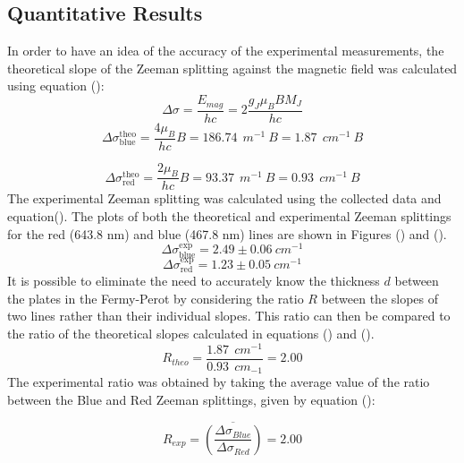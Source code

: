 \documentclass[12pt]{article}
\begin{document}
\subsection{Quantitative Results}
In order to have an idea of the accuracy of the experimental measurements, the theoretical slope of the Zeeman splitting against the magnetic field was calculated using equation ():
$$
\Delta \sigma=  \frac{E_{mag}}{hc}=2\frac{g_J \mu_B B M_J}{hc}
$$
\begin{equation}
   \Delta \sigma_{\text{blue}}^{\text{theo}}= \frac{4\mu_B}{hc} B = 186.74  \ \ m^{-1} \  B= 1.87  \ \ cm^{-1} \  B
\end{equation}

\begin{equation}
   \Delta \sigma_{\text{red}}^{\text{theo}}= \frac{2\mu_B}{hc} B = 93.37 \ \ m^{-1} \  B= 0.93  \ \ cm^{-1} \  B
\end{equation}
The experimental Zeeman splitting was calculated using the collected data and equation(). The plots of both the theoretical and experimental Zeeman splittings for the red (643.8 nm) and blue (467.8 nm) lines are shown in Figures () and ().\\

\begin{equation}
    \Delta \sigma_{\text{blue}}^{\text{exp}}= 2.49 \pm 0.06 \ cm^{-1}
\end{equation}
\begin{equation}
    \Delta \sigma_{\text{red}}^{\text{exp}}= 1.23 \pm 0.05 \  cm^{-1}
\end{equation}
It is possible to eliminate the need to accurately know the thickness $d$ between the plates in the Fermy-Perot by considering the ratio $R$ between the slopes of two lines rather than their individual slopes. This ratio can then be compared to the ratio of the theoretical slopes calculated in equations () and ().
\begin{equation}
    R_{theo}= \frac{1.87 \ \ cm^{-1}}{0.93\ \ cm_{-1}}= 2.00
\end{equation}
The experimental ratio was obtained by taking the average value of the ratio between the Blue and Red Zeeman splittings, given by equation ():

\begin{equation}
    R_{exp}= \overline{\left( \frac{\Delta \sigma_{Blue}}{\Delta \sigma_{Red}} \right)} = 2.00
\end{equation}
\end{document}
